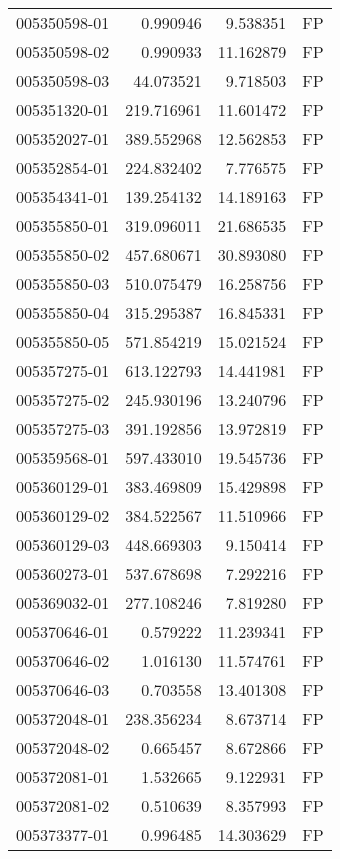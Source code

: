 \begin{tabular}{lrrl}
005350598-01 &    0.990946 &     9.538351 &   FP \\
005350598-02 &    0.990933 &    11.162879 &   FP \\
005350598-03 &   44.073521 &     9.718503 &   FP \\
005351320-01 &  219.716961 &    11.601472 &   FP \\
005352027-01 &  389.552968 &    12.562853 &   FP \\
005352854-01 &  224.832402 &     7.776575 &   FP \\
005354341-01 &  139.254132 &    14.189163 &   FP \\
005355850-01 &  319.096011 &    21.686535 &   FP \\
005355850-02 &  457.680671 &    30.893080 &   FP \\
005355850-03 &  510.075479 &    16.258756 &   FP \\
005355850-04 &  315.295387 &    16.845331 &   FP \\
005355850-05 &  571.854219 &    15.021524 &   FP \\
005357275-01 &  613.122793 &    14.441981 &   FP \\
005357275-02 &  245.930196 &    13.240796 &   FP \\
005357275-03 &  391.192856 &    13.972819 &   FP \\
005359568-01 &  597.433010 &    19.545736 &   FP \\
005360129-01 &  383.469809 &    15.429898 &   FP \\
005360129-02 &  384.522567 &    11.510966 &   FP \\
005360129-03 &  448.669303 &     9.150414 &   FP \\
005360273-01 &  537.678698 &     7.292216 &   FP \\
005369032-01 &  277.108246 &     7.819280 &   FP \\
005370646-01 &    0.579222 &    11.239341 &   FP \\
005370646-02 &    1.016130 &    11.574761 &   FP \\
005370646-03 &    0.703558 &    13.401308 &   FP \\
005372048-01 &  238.356234 &     8.673714 &   FP \\
005372048-02 &    0.665457 &     8.672866 &   FP \\
005372081-01 &    1.532665 &     9.122931 &   FP \\
005372081-02 &    0.510639 &     8.357993 &   FP \\
005373377-01 &    0.996485 &    14.303629 &   FP \\

\end{tabular}

